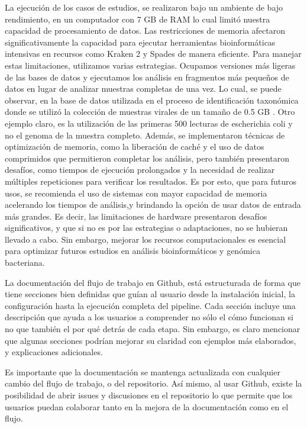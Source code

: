 \documentclass[12pt]{article}
\begin{document}
	
La ejecución de los casos de estudios, se realizaron bajo un ambiente de bajo 
rendimiento, en un computador con 7 GB de RAM lo cual limitó nuestra capacidad 
de procesamiento de datos. Las restricciones de memoria afectaron significativamente 
la capacidad para ejecutar herramientas bioinformáticas intensivas en recursos como 
Kraken 2 y Spades de manera eficiente. Para manejar estas limitaciones, utilizamos 
varias estrategias. Ocupamos versiones más ligeras de las bases de datos y ejecutamos 
los análisis en fragmentos más pequeños de datos en lugar de analizar muestras 
completas de una vez. Lo cual, se puede observar, en la base de datos utilizada en 
el proceso de identificación taxonómica donde se utilizó la colección de muestras 
virales de un tamaño de 0.5 GB . Otro ejemplo claro, es la utilización de las primeras 
500 lecturas de escherichia coli y no el genoma de la muestra completo. Además, 
se implementaron técnicas de optimización de memoria, como la liberación de caché y el 
uso de datos comprimidos que permitieron completar los análisis, pero también presentaron 
desafíos, como tiempos de ejecución prolongados y la necesidad de realizar múltiples 
repeticiones para verificar los resultados. Es por esto, que para futuros usos, 
se recomienda el uso de sistemas con mayor capacidad de memoria acelerando los tiempos 
de análisis,y brindando la opción de usar datos de entrada más grandes. Es decir, las 
limitaciones de hardware presentaron desafíos significativos, y que si no es por las 
estrategias o adaptaciones, no se hubieran llevado a cabo. Sin embargo, mejorar los 
recursos computacionales es esencial para optimizar futuros estudios en análisis 
bioinformáticos y genómica bacteriana.

La documentación del flujo de trabajo en Github, está estructurada de forma 
que tiene secciones bien definidas que guían al usuario desde la instalación 
inicial, la configuración hasta la ejecución completa del pipeline. Cada 
sección incluye una descripción que ayuda a los usuarios a comprender no sólo 
el cómo funcionan si no que también el por qué detrás de cada etapa. Sin embargo, 
es claro mencionar que algunas secciones podrían mejorar su claridad con ejemplos 
más elaborados, y explicaciones adicionales.
	
Es importante que la documentación se mantenga actualizada con cualquier cambio 
del flujo de trabajo, o del repositorio. Así mismo, al usar Github, existe la 
posibilidad de abrir issues y discusiones en el repositorio lo que permite que 
los usuarios puedan colaborar tanto en la mejora de la documentación como en el flujo.
\end{document}
